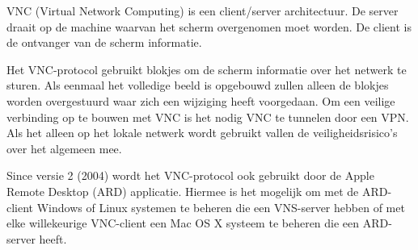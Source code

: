VNC (Virtual Network Computing) is een client/server architectuur. De server draait op de machine waarvan het scherm overgenomen moet worden. De client is de ontvanger van de scherm informatie.

Het VNC-protocol gebruikt blokjes om de scherm informatie over het netwerk te sturen. Als eenmaal het volledige beeld is opgebouwd zullen alleen de blokjes worden overgestuurd waar zich een wijziging heeft voorgedaan. Om een veilige verbinding op te bouwen met VNC is het nodig VNC te tunnelen door een VPN. Als het alleen op het lokale netwerk wordt gebruikt vallen de veiligheidsrisico's over het algemeen mee.

Since versie 2 (2004) wordt het VNC-protocol ook gebruikt door de Apple Remote Desktop (ARD) applicatie. Hiermee is het mogelijk om met de ARD-client Windows of Linux systemen te beheren die een VNS-server hebben of met elke willekeurige VNC-client een Mac OS X systeem te beheren die een ARD-server heeft.

